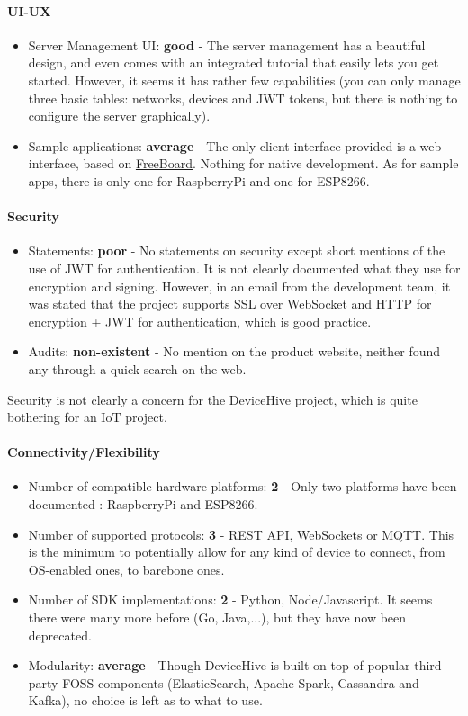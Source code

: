 \documentclass{article}
\begin{document}
\paragraph{UI-UX}

\begin{itemize}
\item Server Management UI: \textbf{good} - The server management has a beautiful design, and even comes with an integrated tutorial that easily lets you get started. However, it seems it has rather few capabilities (you can only manage three basic tables: networks, devices and JWT tokens, but there is nothing to configure the server graphically).
\item Sample applications: \textbf{average} - The only client interface provided is a web interface, based on \href{http://freeboard.io/}{FreeBoard}. Nothing for native development. As for sample apps, there is only one for RaspberryPi and one for ESP8266.
\end{itemize}

\paragraph{Security}

\begin{itemize}
\item Statements: \textbf{poor} - No statements on security except short mentions of the use of JWT for authentication. It is not clearly documented what they use for encryption and signing. However, in an email from the development team, it was stated that the project supports SSL over WebSocket and HTTP for encryption + JWT for authentication, which is good practice.
\item Audits: \textbf{non-existent} - No mention on the product website, neither found any through a quick search on the web.
\end{itemize}

Security is not clearly a concern for the DeviceHive project, which is quite bothering for an IoT project.

\paragraph{Connectivity/Flexibility}

\begin{itemize}
\item Number of compatible hardware platforms: \textbf{2} - Only two platforms have been documented : RaspberryPi and ESP8266.
\item Number of supported protocols: \textbf{3} - REST API, WebSockets or MQTT. This is the minimum to potentially allow for any kind of device to connect, from OS-enabled ones, to barebone ones.
\item Number of SDK implementations: \textbf{2} - Python, Node/Javascript. It seems there were many more before (Go, Java,...), but they have now been deprecated.
\item Modularity: \textbf{average} - Though DeviceHive is built on top of popular third-party FOSS components (ElasticSearch, Apache Spark, Cassandra and Kafka), no choice is left as to what to use.
\end{itemize}
\end{document}
